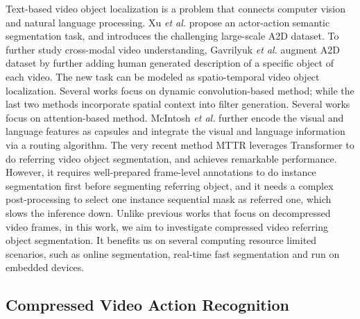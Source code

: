 \documentclass[sigconf]{acmart}
\begin{document}
Text-based video object localization is a problem that connects computer vision and natural language processing. 
Xu \textit{et al.} \cite{xu2015can, xu2016actor, yan2017weakly} propose an actor-action semantic segmentation task, and introduces the challenging large-scale A2D dataset.
To further study cross-modal video understanding, Gavrilyuk \textit{et al.} \cite{gavrilyuk2018actor} augment A2D dataset by further adding human generated description of a specific object of each video. The new task can be modeled as spatio-temporal video object localization. 
Several works \cite{gavrilyuk2018actor, wang2020context, hui2021collaborative, botach2021end} focus on dynamic convolution-based method; while the last two methods incorporate spatial context into filter generation. Several works \cite{wang2019asymmetric, liu2021cross, ye2021referring, seo2020urvos, chen2021cascade} focus on attention-based method. McIntosh \textit{et al.} \cite{mcintosh2020visual} further encode the visual and language features as capsules and integrate the visual and language information via a routing algorithm.
The very recent method MTTR \cite{botach2021end} leverages Transformer to do referring video object segmentation, and achieves remarkable performance. However, it requires well-prepared frame-level annotations to do instance segmentation first before segmenting referring object, and it needs a complex post-processing to select one instance sequential mask as referred one, which slows the inference down. Unlike previous works that focus on decompressed video frames, in this work, we aim to investigate compressed video referring object segmentation. It benefits us on several computing resource limited scenarios, such as online segmentation, real-time fast segmentation and run on embedded devices.


\subsection{Compressed Video Action Recognition}
\end{document}
